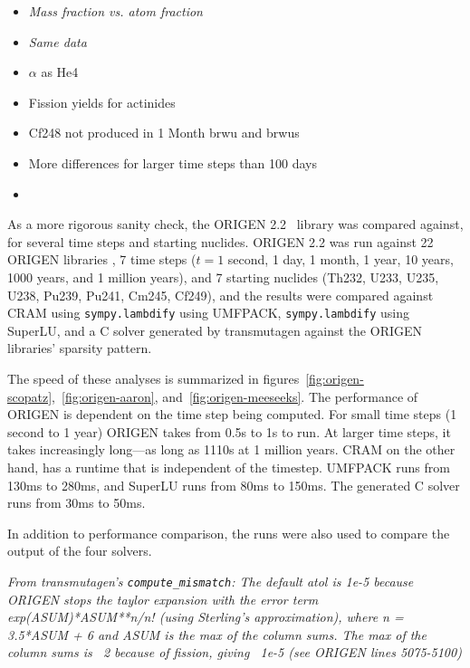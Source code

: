 \begin{itemize}
\item \it{Mass fraction vs. atom fraction}
\item {\it Same data}
\item $\alpha$ as He4
\item Fission yields for actinides
\item Cf248 not produced in 1 Month brwu and brwus
\item More differences for larger time steps than 100 days
\item {}
\end{itemize}

As a more rigorous sanity check, the ORIGEN 2.2~\cite{ationneeded} library was
compared against, for several time steps and starting nuclides. ORIGEN 2.2 was
run against 22 ORIGEN libraries , 7 time steps
($t= 1$ second, 1 day, 1 month, 1 year, 10 years, 1000 years, and 1 million
years), and 7 starting nuclides (Th232, U233, U235, U238, Pu239, Pu241, Cm245,
Cf249), and the results were compared against CRAM using
\texttt{sympy.\allowbreak{}lambdify} using UMFPACK,
\texttt{sympy.\allowbreak{}lambdify} using SuperLU, and a C solver generated
by transmutagen against the ORIGEN libraries' sparsity pattern.

 The speed of these analyses is summarized in
figures~\ref{fig:origen-scopatz},~\ref{fig:origen-aaron},
and~\ref{fig:origen-meeseeks}. The performance of ORIGEN is dependent on the
time step being computed. For small time steps (1 second to 1 year) ORIGEN
takes from 0.5\;s to 1\;s to run. At larger time steps, it takes increasingly
long---as long as 1110\;s at 1 million years. CRAM on the other hand, has a
runtime that is independent of the timestep. UMFPACK runs from 130\;ms to
280\;ms, and SuperLU runs from 80\;ms to 150\;ms. The generated C solver runs
from 30\;ms to 50\;ms. 

In addition to performance comparison, the runs were also used to compare the
output of the four solvers.

\it{From transmutagen's \texttt{compute\_mismatch}:}
The default atol is 1e-5 because ORIGEN stops the taylor expansion with
the error term exp(ASUM)*ASUM**n/n! (using Sterling's approximation),
where n = 3.5*ASUM + 6 and ASUM is the max of the column sums. The max of
the column sums is ~2 because of fission, giving ~1e-5 (see ORIGEN lines
5075-5100)

